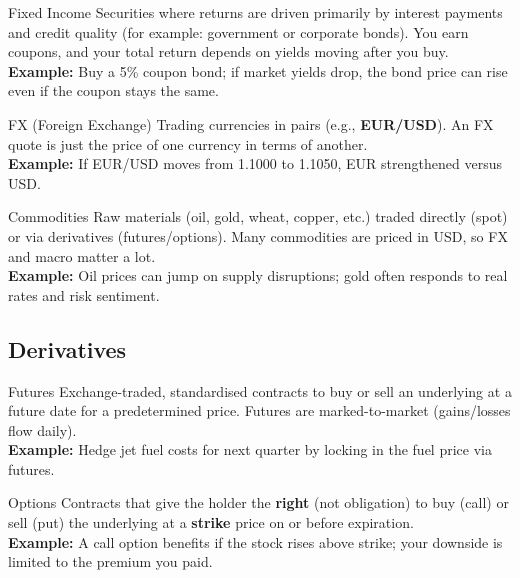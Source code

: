 \begin{keyterm}{Fixed Income}
Securities where returns are driven primarily by interest payments and credit quality
(for example: government or corporate bonds). You earn coupons, and your total return
depends on yields moving after you buy.
\\\textbf{Example:} Buy a 5\% coupon bond; if market yields drop, the bond price can rise
even if the coupon stays the same.
\end{keyterm}

\begin{keyterm}{FX (Foreign Exchange)}
Trading currencies in pairs (e.g., \textbf{EUR/USD}). An FX quote is just the price of one
currency in terms of another.
\\\textbf{Example:} If EUR/USD moves from 1.1000 to 1.1050, EUR strengthened versus USD.
\end{keyterm}

\begin{keyterm}{Commodities}
Raw materials (oil, gold, wheat, copper, etc.) traded directly (spot) or via derivatives
(futures/options). Many commodities are priced in USD, so FX and macro matter a lot.
\\\textbf{Example:} Oil prices can jump on supply disruptions; gold often responds to real
rates and risk sentiment.
\end{keyterm}

\subsection{Derivatives}

\begin{keyterm}{Futures}
Exchange-traded, standardised contracts to buy or sell an underlying at a future date
for a predetermined price. Futures are marked-to-market (gains/losses flow daily).
\\\textbf{Example:} Hedge jet fuel costs for next quarter by locking in the fuel price
via futures.
\end{keyterm}

\begin{keyterm}{Options}
Contracts that give the holder the \textbf{right} (not obligation) to buy (call) or sell
(put) the underlying at a \textbf{strike} price on or before expiration.
\\\textbf{Example:} A call option benefits if the stock rises above strike; your downside
is limited to the premium you paid.
\end{keyterm}

